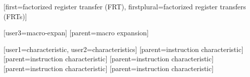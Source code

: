 %
        [first=factorized register transfer (FRT),
         firstplural=factorized register transfers (FRTs)]

[user3={macro-expan}]%
[parent={macro expansion}]


%
        [user1={characteristic}, user2={characteristics}]
%
        [parent={instruction characteristic}]
%
        [parent={instruction characteristic}]
%
        [parent={instruction characteristic}]
%
        [parent={instruction characteristic}]
%
        [parent={instruction characteristic}]
